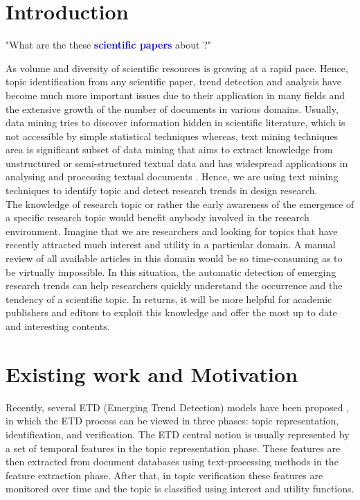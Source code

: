 \documentclass[12pt]{article}
\begin{document}
\section{Introduction}
\begin{center}"What are the these \textcolor{blue}{\textbf{scientific papers}} about ?"\end{center}
\begin{figure}[h]
\centering
\end{figure}
As volume and diversity of scientific resources is growing at a rapid pace. Hence, topic identification from any scientific paper, trend detection and analysis have become much more important issues due to their application in many fields and the extensive growth of the number of documents in various domains. Usually, data mining tries to discover information hidden in scientific literature, which is not accessible by simple statistical techniques \cite{7} whereas, text mining techniques area is significant subset of data mining that aims to extract knowledge from unstructured or semi-structured textual data and has widespread applications in analysing and processing textual documents \cite{8}. Hence, we are using text mining techniques to identify topic and detect research trends in design research.\\
The knowledge of research topic or rather the early awareness of the emergence of a specific research topic would  benefit anybody involved in the research environment. Imagine that we are researchers and looking for topics that have recently attracted much interest and utility in a particular domain. A manual review of all available articles in this domain would be so time-consuming as to be virtually impossible. In this situation, the automatic detection of emerging research trends can help researchers quickly understand the occurrence and the tendency of a scientific topic\cite{1}. In returns, it will be  more helpful  for academic publishers and editors to exploit this knowledge and offer the most up to date and interesting contents.
\section{Existing work and Motivation}
Recently, several ETD (Emerging Trend Detection) models have been proposed \cite{3-5}, in which the ETD process can be viewed in three phases: topic representation, identification, and verification. The ETD central notion is usually represented by a set of temporal features in the topic representation phase. These features are then extracted from document databases using text-processing methods in the feature extraction phase. After that, in topic verification these features are monitored over time and the topic is classified using interest and utility functions\cite{2}.
\end{document}
